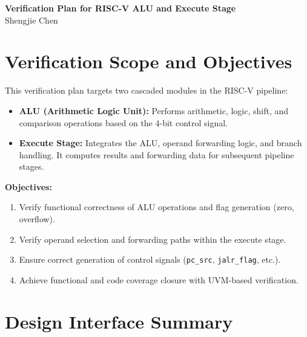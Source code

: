 \documentclass[a4paper,12pt]{article}
\begin{document}
\begin{center}
    \Large \textbf{Verification Plan for RISC-V ALU and Execute Stage}\\[6pt]
    \normalsize Shengjie Chen
\end{center}

\section{Verification Scope and Objectives}

This verification plan targets two cascaded modules in the RISC-V pipeline:
\begin{itemize}
    \item \textbf{ALU (Arithmetic Logic Unit):} Performs arithmetic, logic, shift, and comparison operations based on the 4-bit control signal.
    \item \textbf{Execute Stage:} Integrates the ALU, operand forwarding logic, and branch handling. It computes results and forwarding data for subsequent pipeline stages.
\end{itemize}
\textbf{Objectives:}
\begin{enumerate}
    \item Verify functional correctness of ALU operations and flag generation (zero, overflow).
    \item Verify operand selection and forwarding paths within the execute stage.
    \item Ensure correct generation of control signals (\texttt{pc\_src}, \texttt{jalr\_flag}, etc.).
    \item Achieve functional and code coverage closure with UVM-based verification.
\end{enumerate}

\section{Design Interface Summary}

\end{document}
